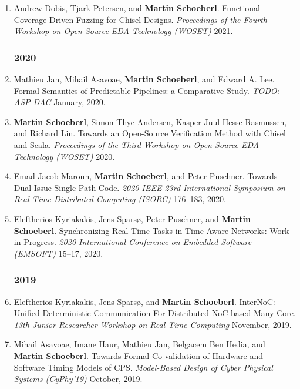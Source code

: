 \begin{enumerate}
\item Andrew Dobis, Tjark Petersen, and {\bf Martin Schoeberl}.
 Functional Coverage-Driven Fuzzing for Chisel Designs.
 \emph{Proceedings of the Fourth Workshop on Open-Source EDA Technology (WOSET)} 2021.



\subsubsection*{2020}

\item Mathieu Jan, Mihail Asavoae, {\bf Martin Schoeberl}, and Edward A. Lee.
 Formal Semantics of Predictable Pipelines: a Comparative Study.
 \emph{TODO: ASP-DAC} January, 2020.

\item {\bf Martin Schoeberl}, Simon Thye Andersen, Kasper Juul Hesse Rasmussen, and Richard Lin.
 Towards an Open-Source Verification Method with Chisel and Scala.
 \emph{Proceedings of the Third Workshop on Open-Source EDA Technology (WOSET)} 2020.

\item Emad Jacob Maroun, {\bf Martin Schoeberl}, and Peter Puschner.
 Towards Dual-Issue Single-Path Code.
 \emph{2020 IEEE 23rd International Symposium on Real-Time Distributed Computing (ISORC)} 176--183, 2020.

\item Eleftherios Kyriakakis, Jens Spars{\o}, Peter Puschner, and {\bf Martin Schoeberl}.
 Synchronizing Real-Time Tasks in Time-Aware Networks: Work-in-Progress.
 \emph{2020 International Conference on Embedded Software (EMSOFT)} 15--17, 2020.


\subsubsection*{2019}

\item Eleftherios Kyriakakis, Jens Spars{\o}, and {\bf Martin Schoeberl}.
 InterNoC: Unified Deterministic Communication For Distributed NoC-based Many-Core.
 \emph{13th Junior Researcher Workshop on Real-Time Computing} November, 2019.

\item Mihail Asavoae, Imane Haur, Mathieu Jan, Belgacem Ben Hedia, and {\bf Martin Schoeberl}.
 Towards Formal Co-validation of Hardware and Software Timing Models of CPS.
 \emph{Model-Based Design of Cyber Physical Systems (CyPhy'19)} October, 2019.


\end{enumerate}
